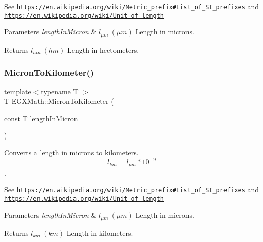 See \href{https://en.wikipedia.org/wiki/Metric_prefix#List_of_SI_prefixes}{\tt https\+://en.\+wikipedia.\+org/wiki/\+Metric\+\_\+prefix\#\+List\+\_\+of\+\_\+\+S\+I\+\_\+prefixes} and \href{https://en.wikipedia.org/wiki/Unit_of_length}{\tt https\+://en.\+wikipedia.\+org/wiki/\+Unit\+\_\+of\+\_\+length} 
\begin{DoxyParams}{Parameters}
{\em length\+In\+Micron} & $ l_{\mu m}\ (\mu m)$ Length in microns. \\
\hline
\end{DoxyParams}
\begin{DoxyReturn}{Returns}
$ l_{hm}\ (hm)$ Length in hectometers. 
\end{DoxyReturn}
\mbox{\label{group___e_g_x_math-_conversions-_length_conversions-_non-_s_i-_micron-_s_i_ga32266166f54e31b9dde1c47155dcb4ad}} 
\subsubsection{\texorpdfstring{Micron\+To\+Kilometer()}{MicronToKilometer()}}
{\footnotesize\ttfamily template$<$typename T $>$ \\
T E\+G\+X\+Math\+::\+Micron\+To\+Kilometer (\begin{DoxyParamCaption}\item[{const T}]{length\+In\+Micron }\end{DoxyParamCaption})}



Converts a length in microns to kilometers. \[ l_{km}=l_{\mu m} * 10^{-9} \]. 

See \href{https://en.wikipedia.org/wiki/Metric_prefix#List_of_SI_prefixes}{\tt https\+://en.\+wikipedia.\+org/wiki/\+Metric\+\_\+prefix\#\+List\+\_\+of\+\_\+\+S\+I\+\_\+prefixes} and \href{https://en.wikipedia.org/wiki/Unit_of_length}{\tt https\+://en.\+wikipedia.\+org/wiki/\+Unit\+\_\+of\+\_\+length} 
\begin{DoxyParams}{Parameters}
{\em length\+In\+Micron} & $ l_{\mu m}\ (\mu m)$ Length in microns. \\
\hline
\end{DoxyParams}
\begin{DoxyReturn}{Returns}
$ l_{km}\ (km)$ Length in kilometers. 
\end{DoxyReturn}
\mbox{\label{group___e_g_x_math-_conversions-_length_conversions-_non-_s_i-_micron-_s_i_ga044475633903b9766ffd7685e7198600}} 

